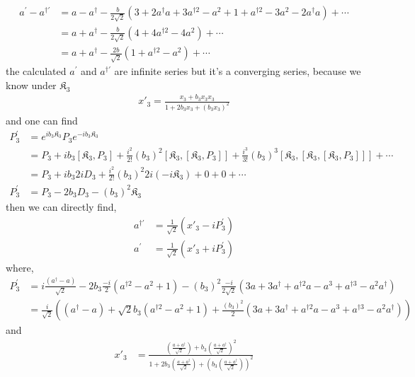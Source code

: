 \documentclass[]{article}
\numberwithin{equation}{section}
\begin{document}
{{\begin{align}
    a^{\prime}-a^{\dagger\prime}&=a-a^{\dagger}-\frac{b}{2\sqrt{2}}\left(3+2a^\dagger a+3a^{\dagger 2}-a^2+1+a^{\dagger 2}-3a^2-2a^{\dagger} a\right)+ \cdots\\
    &=a+a^{\dagger}-\frac{b}{2\sqrt{2}}\left(4+4a^{\dagger 2}-4a^2\right)+ \cdots\\
    &=a+a^{\dagger}-\frac{2b}{\sqrt{2}}\left(1+a^{\dagger 2}-a^2\right)+ \cdots
\end{align}
the calculated $ a^{\prime}$ and $a^{\dagger\prime}$ are infinite series but it's a converging series, because we know under $\mathfrak{K}_{3}$
\begin{align}
    x'_{3}={\frac {x_{3 }+b_{3 }x_{3}x_{3}}{1+2b_{3} x_{3}+(b_{3}x_{3})^{2}}}
\end{align}
and one can find
\begin{align}
    P_{3}^{\prime}&=e^{ib_{3}  \mathfrak{K}_{3}}P_{3}e^{-ib_{3}  \mathfrak{K}_{3}}\\
    &=P_{3} + ib_{3}\left[  \mathfrak{K}_{3}, P_{3} \right] + \frac{i^2}{2!}(b_{3})^{2}\left[  \mathfrak{K}_{3}, \left[  \mathfrak{K}_{3}, P_{3} \right]\right] + \frac{i^3}{3!}(b_{3})^{3}\left[  \mathfrak{K}_{3},\left[  \mathfrak{K}_{3}, \left[  \mathfrak{K}_{3}, P_{3} \right]\right]\right] + \cdots\\
    &=P_{3} + ib_{3}2iD_{3}+\frac{i^2}{2!}(b_{3})^{2}2i(-i\mathfrak{K}_{3})+0+0+\cdots\\
     P_{3}^{\prime}&=P_{3} - 2b_{3}D_{3}-(b_{3})^{2}\mathfrak{K}_{3}
\end{align}
then we can directly find,
\begin{align}
    a^{\dagger\prime}&=\frac{1}{\sqrt{2}}(x'_{3}-iP_{3}^{\prime})\\
    a^{\prime}&=\frac{1}{\sqrt{2}}(x'_{3}+iP_{3}^{\prime})
\end{align}
where,
\begin{align}
         P_{3}^{\prime}&=i\frac{(a^{\dagger}-a)}{\sqrt{2}} - 2b_{3}\frac{-i}{2}\left(a^{\dagger 2} - a^2+1\right)-(b_{3})^{2}\frac{-i}{2\sqrt{2}}\left(3a+3a^{\dagger}+  a^{\dagger 2}a - a^3 +  a^{\dagger 3} - a^2 a^{\dagger}\right)\\
         &=\frac{i}{\sqrt{2}}\left((a^{\dagger}-a) +\sqrt{2}b_{3}\left(a^{\dagger 2} - a^2+1\right)+\frac{(b_{3})^{2}}{2}\left(3a+3a^{\dagger}+  a^{\dagger 2}a - a^3 +  a^{\dagger 3} - a^2 a^{\dagger}\right)\right)
\end{align}
and
\begin{align}
    x'_{3}&={\frac {\left(\frac{a+a^{\dagger}}{\sqrt{2}}\right)+b_{3 }\left(\frac{a+a^{\dagger}}{\sqrt{2}}\right)^{2}}{1+2b_{3} \left(\frac{a+a^{\dagger}}{\sqrt{2}}\right)+(b_{3}\left(\frac{a+a^{\dagger}}{\sqrt{2}}\right))^{2}}}\\

\end{align}}}
\end{document}
